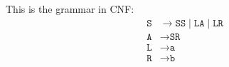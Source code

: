 \documentclass[a4paper, 11pt]{article}
\begin{document}
This is the grammar in CNF:
\begin{align*}
\texttt{S} & \rightarrow \texttt{SS} \mid  \texttt{LA} \mid \texttt{LR}  \\
\texttt{A} & \rightarrow \texttt{SR} \\
\texttt{L} & \rightarrow \texttt{a} \\
\texttt{R} & \rightarrow \texttt{b} 
\end{align*}
\end{document}
